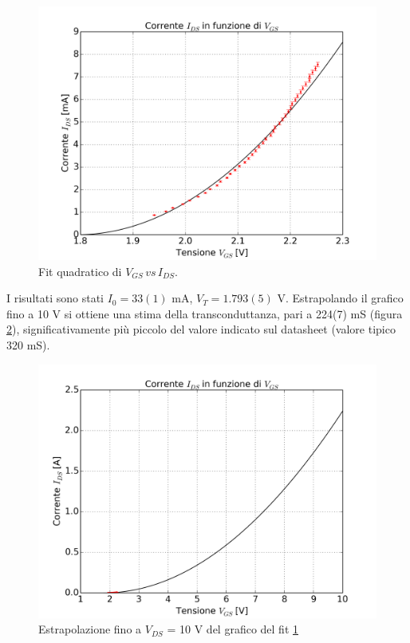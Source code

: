 \documentclass[journal, a4paper]{IEEEtran}
\begin{document}
\begin{figure}[htp]
\centering
\includegraphics[scale=.4]{fit_es8}
\caption{Fit quadratico di $V_{GS} \, vs \, I_{DS}$.}
\label{fig:fit}
\end{figure}

I risultati sono stati $I_0 = 33(1)$ mA, $V_T = 1.793(5)$ V. Estrapolando il grafico fino a 10 V si ottiene una stima della transconduttanza, pari a 224(7) mS (figura \ref{fig:fit2}), significativamente più piccolo del valore indicato sul datasheet (valore tipico 320 mS).

\begin{figure}[htp]
\centering
\includegraphics[scale=.4]{fit_es8_es}
\caption{Estrapolazione fino a $V_{DS}$ = 10 V del grafico del fit \ref{fig:fit}}
\label{fig:fit2}
\end{figure}
\end{document}
